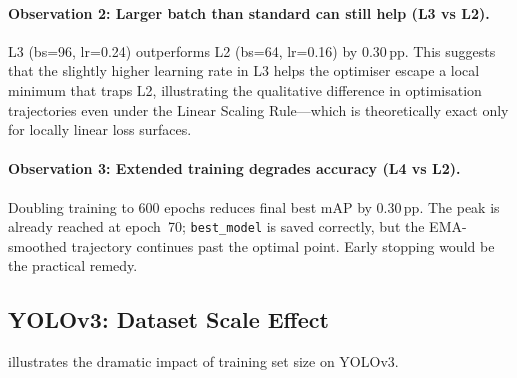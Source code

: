 \paragraph{Observation 2: Larger batch than standard can still help (L3 vs L2).}
L3 (bs=96, lr=0.24) outperforms L2 (bs=64, lr=0.16) by 0.30\,pp.
This suggests that the slightly higher learning rate in L3 helps
the optimiser escape a local minimum that traps L2, illustrating
the qualitative difference in optimisation trajectories even under
the Linear Scaling Rule---which is theoretically exact only for
locally linear loss surfaces.

\paragraph{Observation 3: Extended training degrades accuracy (L4 vs L2).}
Doubling training to 600 epochs reduces final best mAP by 0.30\,pp.
The peak is already reached at epoch~70; \texttt{best\_model} is saved
correctly, but the EMA-smoothed trajectory continues past the optimal
point.  Early stopping would be the practical remedy.

\subsection{YOLOv3: Dataset Scale Effect}
\label{sec:results:yolov3_scale}

 illustrates the dramatic impact of training
set size on YOLOv3.

